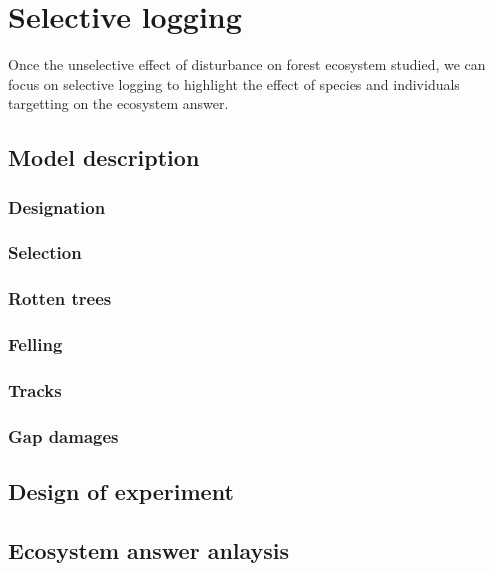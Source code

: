 \documentclass[]{article}
\let\oldsection\section
\renewcommand\section{\newpage\oldsection}
\theoremstyle{definition}
\theoremstyle{definition}
\theoremstyle{remark}
\begin{document}
\section{Selective logging}\label{selective-logging}

Once the unselective effect of disturbance on forest ecosystem studied,
we can focus on selective logging to highlight the effect of species and
individuals targetting on the ecosystem answer.

\subsection{Model description}\label{model-description-2}

\subsubsection{Designation}\label{designation}

\subsubsection{Selection}\label{selection}

\subsubsection{Rotten trees}\label{rotten-trees}

\subsubsection{Felling}\label{felling}

\subsubsection{Tracks}\label{tracks}

\subsubsection{Gap damages}\label{gap-damages}

\subsection{Design of experiment}\label{design-of-experiment-1}

\subsection{Ecosystem answer
anlaysis}\label{ecosystem-answer-anlaysis-1}
\end{document}
